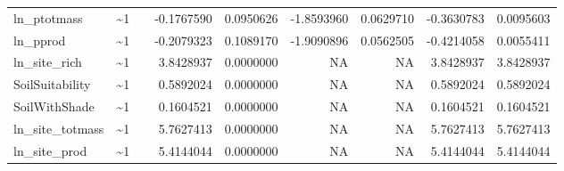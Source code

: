 \documentclass[ignorenonframetext,]{beamer}
\begin{document}
\begin{frame}
\begin{longtable}[]{@{}lllrrrrrr@{}}
ln\_ptotmass & \textasciitilde{}1 & & -0.1767590 & 0.0950626 &
-1.8593960 & 0.0629710 & -0.3630783 & 0.0095603\tabularnewline
ln\_pprod & \textasciitilde{}1 & & -0.2079323 & 0.1089170 & -1.9090896 &
0.0562505 & -0.4214058 & 0.0055411\tabularnewline
ln\_site\_rich & \textasciitilde{}1 & & 3.8428937 & 0.0000000 & NA & NA
& 3.8428937 & 3.8428937\tabularnewline
SoilSuitability & \textasciitilde{}1 & & 0.5892024 & 0.0000000 & NA & NA
& 0.5892024 & 0.5892024\tabularnewline
SoilWithShade & \textasciitilde{}1 & & 0.1604521 & 0.0000000 & NA & NA &
0.1604521 & 0.1604521\tabularnewline
ln\_site\_totmass & \textasciitilde{}1 & & 5.7627413 & 0.0000000 & NA &
NA & 5.7627413 & 5.7627413\tabularnewline
ln\_site\_prod & \textasciitilde{}1 & & 5.4144044 & 0.0000000 & NA & NA
& 5.4144044 & 5.4144044\tabularnewline
\bottomrule
\end{longtable}

\end{frame}
\end{document}
